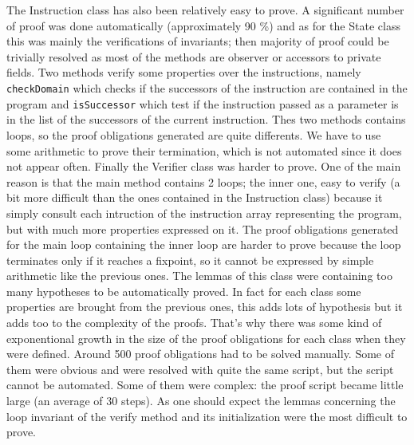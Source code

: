 The Instruction class has also been relatively easy to prove.  A
significant number of proof was done automatically (approximately 90
\%) and as for the State class this was mainly the verifications of
invariants; then majority of proof could be trivially resolved as most
of the methods are observer or accessors to private fields.  Two
methods verify some properties over the instructions, namely {\tt
checkDomain} which checks if the successors of the instruction are
contained in the program and {\tt isSuccessor} which test if the
instruction passed as a parameter is in the list of the successors of
the current instruction.  Thes two methods contains loops, so the
proof obligations generated are quite differents. We have to use some
arithmetic to prove their termination, which is not automated since it
does not appear often.  Finally the Verifier class was harder to
prove. One of the main reason is that the main method contains 2
loops; the inner one, easy to verify (a bit more difficult than the
ones contained in the Instruction class) because it simply consult
each intruction of the instruction array representing the program, but
with much more properties expressed on it. The proof obligations
generated for the main loop containing the inner loop are harder to
prove because the loop terminates only if it reaches a fixpoint, so it
cannot be expressed by simple arithmetic like the previous ones.  The
lemmas of this class were containing too many hypotheses to be
automatically proved.  In fact for each class some properties are
brought from the previous ones, this adds lots of hypothesis but it
adds too to the complexity of the proofs.  That's why there was some
kind of exponentional growth in the size of the proof obligations for
each class when they were defined.  Around 500 proof obligations had
to be solved manually.  Some of them were obvious and were resolved
with quite the same script, but the script cannot be automated.  Some
of them were complex: the proof script became little large (an average
of 30 steps).  As one should expect the lemmas concerning the loop
invariant of the verify method and its initialization were the most
difficult to prove.





